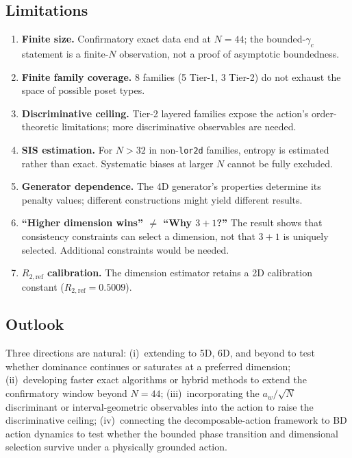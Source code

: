 \documentclass[12pt,a4paper]{article}
\begin{document}
\subsection{Limitations}

\begin{enumerate}[nosep]
\item \textbf{Finite size.} Confirmatory exact data end at $N = 44$; the
bounded-$\gamma_c$ statement is a finite-$N$ observation, not a proof of
asymptotic boundedness.
\item \textbf{Finite family coverage.} 8 families (5 Tier-1, 3 Tier-2) do not
exhaust the space of possible poset types.
\item \textbf{Discriminative ceiling.} Tier-2 layered families expose the
action's order-theoretic limitations; more discriminative observables are needed.
\item \textbf{SIS estimation.} For $N > 32$ in non-\texttt{lor2d} families,
entropy is estimated rather than exact. Systematic biases at larger $N$ cannot
be fully excluded.
\item \textbf{Generator dependence.} The 4D generator's properties determine its
penalty values; different constructions might yield different results.
\item \textbf{``Higher dimension wins'' $\neq$ ``Why $3{+}1$?''} The result
shows that consistency constraints can select a dimension, not that
$3{+}1$ is uniquely selected. Additional constraints would be needed.
\item \textbf{$R_{2,\text{ref}}$ calibration.} The dimension estimator retains a
2D calibration constant ($R_{2,\text{ref}} = 0.5009$).
\end{enumerate}

\subsection{Outlook}

Three directions are natural: (i)~extending to 5D, 6D, and beyond to test
whether dominance continues or saturates at a preferred dimension;
(ii)~developing faster exact algorithms or hybrid methods to extend the
confirmatory window beyond $N = 44$; (iii)~incorporating the $a_w/\sqrt{N}$
discriminant or interval-geometric observables into the action to raise the
discriminative ceiling; (iv)~connecting the decomposable-action framework to BD
action dynamics to test whether the bounded phase transition and dimensional
selection survive under a physically grounded action.
\end{document}
